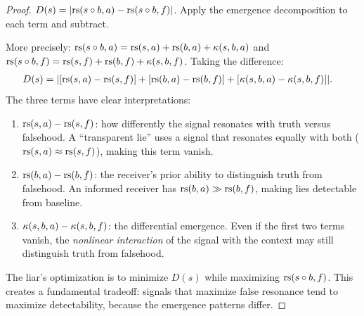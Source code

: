 \begin{proof}
$D(s) = |\mathrm{rs}(s \circ b, a) - \mathrm{rs}(s \circ b, f)|$.
Apply the emergence decomposition to each term and subtract.

More precisely: $\mathrm{rs}(s \circ b, a) = \mathrm{rs}(s, a) + \mathrm{rs}(b, a) + \kappa(s, b, a)$
and $\mathrm{rs}(s \circ b, f) = \mathrm{rs}(s, f) + \mathrm{rs}(b, f) + \kappa(s, b, f)$.
Taking the difference:
\begin{align*}
D(s) &= |[\mathrm{rs}(s, a) - \mathrm{rs}(s, f)] + [\mathrm{rs}(b, a) - \mathrm{rs}(b, f)]
+ [\kappa(s, b, a) - \kappa(s, b, f)]|.
\end{align*}
The three terms have clear interpretations:
\begin{enumerate}
\item $\mathrm{rs}(s, a) - \mathrm{rs}(s, f)$: how differently the signal resonates with
truth versus falsehood. A ``transparent lie'' uses a signal that resonates
equally with both ($\mathrm{rs}(s, a) \approx \mathrm{rs}(s, f)$), making this term vanish.
\item $\mathrm{rs}(b, a) - \mathrm{rs}(b, f)$: the receiver's prior ability to distinguish
truth from falsehood. An informed receiver has $\mathrm{rs}(b, a) \gg \mathrm{rs}(b, f)$,
making lies detectable from baseline.
\item $\kappa(s, b, a) - \kappa(s, b, f)$: the differential emergence.
Even if the first two terms vanish, the \emph{nonlinear interaction} of the
signal with the context may still distinguish truth from falsehood.
\end{enumerate}
The liar's optimization is to minimize $D(s)$ while maximizing $\mathrm{rs}(s \circ b, f)$.
This creates a fundamental tradeoff: signals that maximize false resonance
tend to maximize detectability, because the emergence patterns differ.
\end{proof}

